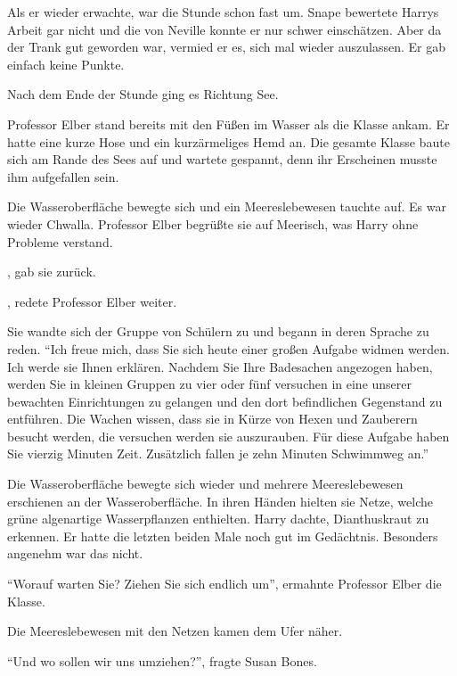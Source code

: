 Als er wieder erwachte, war die Stunde schon fast um. Snape bewertete Harrys Arbeit gar nicht und die von Neville konnte er nur schwer einschätzen. Aber da der Trank gut geworden war, vermied er es, sich mal wieder auszulassen. Er gab einfach keine Punkte.

Nach dem Ende der Stunde ging es Richtung See.

Professor Elber stand bereits mit den Füßen im Wasser als die Klasse ankam. Er hatte eine kurze Hose und ein kurzärmeliges Hemd an. Die gesamte Klasse baute sich am Rande des Sees auf und wartete gespannt, denn ihr Erscheinen musste ihm aufgefallen sein.

Die Wasseroberfläche bewegte sich und ein Meereslebewesen tauchte auf. Es war wieder Chwalla. Professor Elber begrüßte sie auf Meerisch, was Harry ohne Probleme verstand. 

, gab sie zurück.

, redete Professor Elber weiter.

 Sie wandte sich der Gruppe von Schülern zu und begann in deren Sprache zu reden. \enquote{Ich freue mich, dass Sie sich heute einer großen Aufgabe widmen werden. Ich werde sie Ihnen erklären. Nachdem Sie Ihre Badesachen angezogen haben, werden Sie in kleinen Gruppen zu vier oder fünf versuchen in eine unserer bewachten Einrichtungen zu gelangen und den dort befindlichen Gegenstand zu entführen. Die Wachen wissen, dass sie in Kürze von Hexen und Zauberern besucht werden, die versuchen werden sie auszurauben. Für diese Aufgabe haben Sie vierzig Minuten Zeit. Zusätzlich fallen je zehn Minuten Schwimmweg an.}

Die Wasseroberfläche bewegte sich wieder und mehrere Meereslebewesen erschienen an der Wasseroberfläche. In ihren Händen hielten sie Netze, welche grüne algenartige Wasserpflanzen enthielten. Harry dachte, Dianthuskraut zu erkennen.  Er hatte die letzten beiden Male noch gut im Gedächtnis. Besonders angenehm war das nicht.

\enquote{Worauf warten Sie? Ziehen Sie sich endlich um}, ermahnte Professor Elber die Klasse.

Die Meereslebewesen mit den Netzen kamen dem Ufer näher.

\enquote{Und wo sollen wir uns umziehen?}, fragte Susan Bones.

